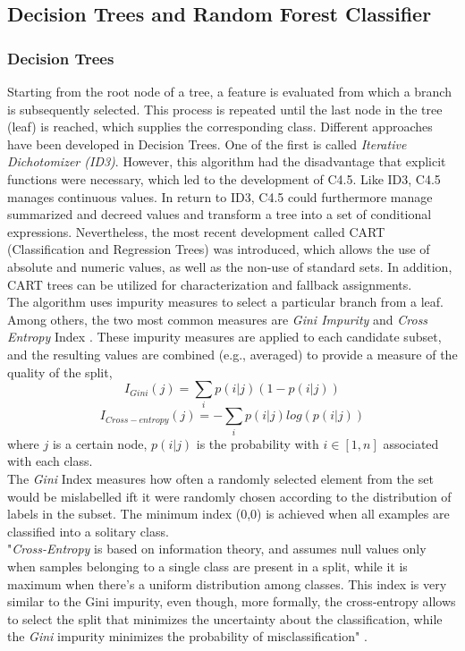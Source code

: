 \documentclass[a4paper, 11pt,titlepage,oneside,openany]{book}
\begin{document}
\subsection{Decision Trees and Random Forest Classifier}
\subsubsection{Decision Trees}
Starting from the root node of a tree, a feature is evaluated from which a branch is subsequently selected. This process is repeated until the last node in the tree (leaf) is reached, which supplies the corresponding class. Different approaches have been developed in Decision Trees. One of the first is called \textit{Iterative Dichotomizer (ID3)}. However, this algorithm had the disadvantage that explicit functions were necessary, which led to the development of C4.5. Like ID3, C4.5 manages continuous values. In return to ID3, C4.5 could furthermore manage summarized and decreed values and transform a tree into a set of conditional expressions. Nevertheless, the most recent development called CART (Classification and Regression Trees) was introduced, which allows the use of absolute and numeric values, as well as the non-use of standard sets. In addition, CART trees can be utilized for characterization and fallback assignments. \cite{algorithms2}\\
\noindent The algorithm uses impurity measures to select a particular branch from a leaf. Among others, the two most common measures are \textit{Gini Impurity} and \textit{Cross Entropy} Index \cite{algorithms}.  These impurity measures are  applied to each candidate subset, and the resulting values are combined (e.g., averaged) to provide a measure of the quality of the split,
\newpage
\[
I_{Gini}(j)=\sum_{i}p(i|j)(1-p(i|j))
\]
\[
I_{Cross-entropy}(j)=-\sum_{i}p(i|j)log(p(i|j))
\]
where $j$ is a certain node, $p(i|j)$ is the probability with $i \in [1,n]$ associated with each class.\\
\noindent The \textit{Gini} Index measures how often a randomly selected element from the set would be mislabelled ift it were randomly chosen according to the distribution of labels in the subset. The minimum index (0,0) is achieved when all examples are classified into a solitary class.\\
\noindent "\textit{Cross-Entropy} is based on information theory, and assumes null values only when samples belonging to a single class are present in a split, while it is maximum when there's a uniform distribution among classes. This index is very similar to the Gini impurity, even though, more formally, the cross-entropy allows to select the split that minimizes the uncertainty about the classification, while the \textit{Gini} impurity minimizes the probability of misclassification" \cite{algorithms}.
\end{document}
